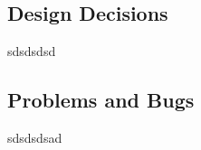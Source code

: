 \documentclass[]{article}
\begin{document}
\vspace*{0.8cm}
\subsection*{Design Decisions}

sdsdsdsd

\vspace*{0.8cm}
\subsection*{Problems and Bugs}

sdsdsdsad


\break
\setlength{}
\printbibliography[title={References}]

\end{document}
